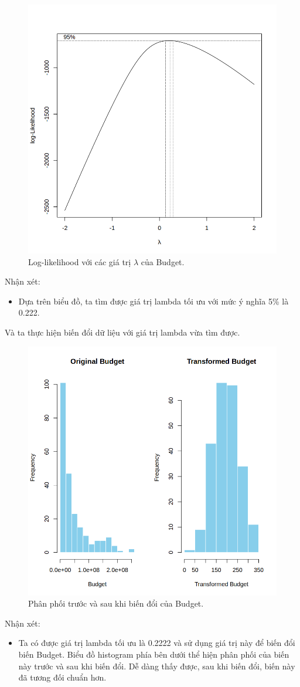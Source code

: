 \begin{figure}[H]
    \centering
    \includegraphics[width=0.75\columnwidth]{csm_figures/budget_optimal_lambda.png}
    \caption{Log-likelihood với các giá trị $\lambda$ của Budget.}
    \label{fig:budget_optimal_lambda}
\end{figure}
Nhận xét:
\begin{itemize}
    \item Dựa trên biểu đồ, ta tìm được giá trị lambda tối ưu với mức ý nghĩa 5\% là 0.222.
\end{itemize}

Và ta thực hiện biến đổi dữ liệu với giá trị lambda vừa tìm được.
\begin{figure}[H]
    \centering
    \includegraphics[width=0.75\columnwidth]{csm_figures/budget_transformed_distribution.png}
    \caption{Phân phối trước và sau khi biến đổi của Budget.}
    \label{fig:budget_transformed_distribution}
\end{figure}
Nhận xét:
\begin{itemize}
    \item Ta có được giá trị lambda tối ưu là 0.2222 và sử dụng giá trị này để biến đổi biến Budget. Biểu đồ histogram phía bên dưới thể hiện phân phối của biến này trước và sau khi biến đổi. Dễ dàng thấy được, sau khi biến đổi, biến này đã tương đối chuẩn hơn.
\end{itemize}

